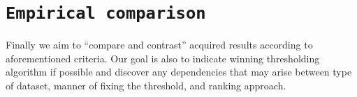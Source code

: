 \documentclass[12pt,a4paper,twocolumn]{article}
\begin{document}
\section*{\texttt{Empirical comparison}}
Finally we aim to ``compare and contrast'' acquired results according to aforementioned criteria. Our goal is also to indicate winning thresholding algorithm if possible and discover any dependencies that may arise between type of dataset, manner of fixing the threshold, and ranking approach.

\end{document}
